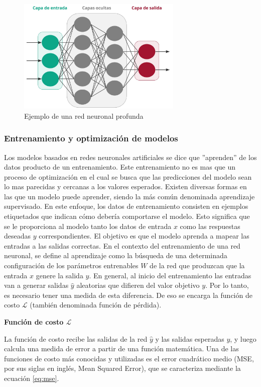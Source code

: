 \begin{figure}[h]
    \centering
    \includegraphics[width=0.7\textwidth]{figures/2.2.net.png}
    \caption{Ejemplo de una red neuronal profunda} 
    \label{fig:2.2.net}
\end{figure}

\subsubsection{Entrenamiento y optimización de modelos}

Los modelos basados en redes neuronales artificiales se dice que ''aprenden'' de los datos producto de un entrenamiento. Este entrenamiento no es mas que un proceso de optimización en el cual se busca que las predicciones del modelo sean lo mas parecidas y cercanas a los valores esperados. Existen diversas formas en las que un modelo puede aprender, siendo la más común denominada aprendizaje supervisado. En este enfoque, los datos de entrenamiento consisten en ejemplos etiquetados que indican cómo debería comportarse el modelo. Esto significa que se le proporciona al modelo tanto los datos de entrada $x$ como las respuestas deseadas $y$ correspondientes. El objetivo es que el modelo aprenda a mapear las entradas a las salidas correctas. En el contexto del entrenamiento de una red neuronal, se define al aprendizaje como la búsqueda de una determinada configuración de los parámetros entrenables $W$ de la red que produzcan que la entrada $x$ genere la salida $y$. En general, al inicio del entrenamiento las entradas van a generar salidas $\hat{y}$ aleatorias que difieren del valor objetivo $y$. Por lo tanto, es necesario tener una medida de esta diferencia. De eso se encarga la función de costo $\mathcal{L}$ (también denominada función de pérdida).

{\large \textbf{Función de costo $\mathcal{L}$}}


La función de costo recibe las salidas de la red $\hat{y}$ y las salidas esperadas $y$, y luego calcula una medida de error a partir de una función matemática. Una de las funciones de costo más conocidas y utilizadas es el error cuadrático medio (MSE, por sus siglas en inglés, Mean Squared Error), que se caracteriza mediante la ecuación \eqref{eq:mse}.

